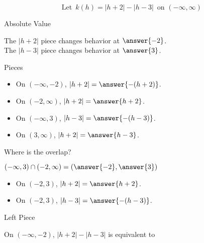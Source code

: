 \documentclass{ximera}
\author{Lee Wayand}
\begin{document}
\[
\text{ Let } \, k(h) = |h+2| - |h-3| \, \text{ on } (-\infty, \infty)
\]







\begin{exercise} Absolute Value


The $|h+2|$ piece changes behavior at $\answer{-2}$. \\

The $|h-3|$ piece changes behavior at $\answer{3}$. \\

\end{exercise}










\begin{exercise} Pieces


\begin{itemize}
\item On $(-\infty, -2)$, $|h+2| = \answer{-(h+2)}$.
\item On $(-2, \infty)$, $|h+2| = \answer{h+2}$.
\item On $(-\infty, 3)$, $|h-3| = \answer{-(h-3)}$.
\item On $(3, \infty)$, $|h+2| = \answer{h-3}$.
\end{itemize}
Where is the overlap?


$(-\infty, 3) \cap (-2, \infty) = \left( \answer{-2}, \answer{3} \right)$ \\





\begin{itemize}
\item On $(-2,3)$, $|h+2| = \answer{h+2}$.
\item On $(-2,3)$, $|h-3| = \answer{-(h-3)}$.
\end{itemize}




\end{exercise}











\begin{exercise} Left Piece


On $(-\infty, -2)$, $|h+2| - |h-3|$ is equivalent to


\begin{multipleChoice}
\end{multipleChoice}

\end{exercise}
\end{document}
